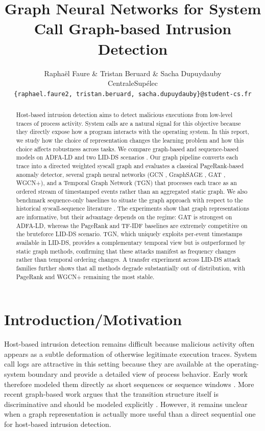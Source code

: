 \documentclass{article}
\title{Graph Neural Networks for System Call Graph-based Intrusion Detection}
\author{Raphaël Faure \& Tristan Beruard \& Sacha Dupuydauby \\
CentraleSupélec \\
\texttt{\{raphael.faure2, tristan.beruard, sacha.dupuydauby\}@student-cs.fr} \\
}
\begin{document}
\maketitle


\begin{abstract}

Host-based intrusion detection aims to detect malicious executions from low-level traces of process activity. System calls are a natural signal for this objective because they directly expose how a program interacts with the operating system. In this report, we study how the choice of representation changes the learning problem and how this choice affects robustness across tasks. We compare graph-based and sequence-based models on ADFA-LD \cite{adfa} and two LID-DS scenarios \cite{lid_ds}. Our graph pipeline converts each trace into a directed weighted syscall graph and evaluates a classical PageRank-based anomaly detector, several graph neural networks (GCN \cite{gcn}, GraphSAGE \cite{graphsage}, GAT \cite{gat}, WGCN+), and a Temporal Graph Network (TGN) \cite{tgn} that processes each trace as an ordered stream of timestamped events rather than an aggregated static graph. We also benchmark sequence-only baselines to situate the graph approach with respect to the historical syscall-sequence literature \cite{unm_syscalls}. The experiments show that graph representations are informative, but their advantage depends on the regime: GAT is strongest on ADFA-LD, whereas the PageRank and TF-IDF baselines are extremely competitive on the bruteforce LID-DS scenario. TGN, which uniquely exploits per-event timestamps available in LID-DS, provides a complementary temporal view but is outperformed by static graph methods, confirming that these attacks manifest as frequency changes rather than temporal ordering changes. A transfer experiment across LID-DS attack families further shows that all methods degrade substantially out of distribution, with PageRank and WGCN+ remaining the most stable.

\end{abstract}

\section{Introduction/Motivation}

Host-based intrusion detection remains difficult because malicious activity often appears as a subtle deformation of otherwise legitimate execution traces. System call logs are attractive in this setting because they are available at the operating-system boundary and provide a detailed view of process behavior. Early work therefore modeled them directly as short sequences or sequence windows \cite{unm_syscalls,alt_syscall_models}. More recent graph-based work argues that the transition structure itself is discriminative and should be modeled explicitly \cite{syscall_graphs}. However, it remains unclear when a graph representation is actually more useful than a direct sequential one for host-based intrusion detection.
\end{document}

